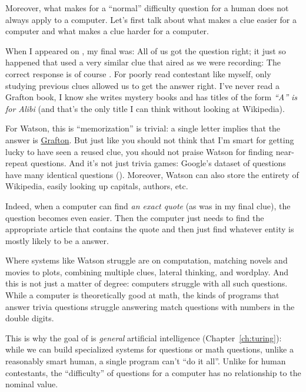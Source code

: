 Moreover, what makes for a ``normal'' difficulty question for a human
does not always apply to a computer.
%
Let's first talk about what makes a clue easier for a computer and what makes a clue harder for a computer.

When I appeared on \jeopardyp{}, my final \jeopardy{} was:
%
%
All of us got the question right; it just so happened that \jeopardy{}
used a very similar clue that aired as we were recording:
%
%
The correct response is of course .
%
For poorly read contestant like myself, only studying previous clues
allowed us to get the answer right.
%
I've never read a Grafton book, I know she writes mystery books and
has titles of the form \textit{``A'' is for Alibi} (and that's the
only title I can think without looking at Wikipedia).

For Watson, this is ``memorization'' is trivial: a single letter
implies that the answer is \underline{Grafton}.
%
But just like you should not think that I'm smart for getting lucky to
have seen a reused clue, you should not praise Watson for finding
near-repeat questions.
%
And it's not just trivia games: Google's dataset of questions have
many identical questions ().
%
Moreover, Watson can also store the entirety of Wikipedia, easily
looking up capitals, authors, etc.

Indeed, when a computer can find \emph{an exact quote} (as was in my final \jeopardy{} clue), the question becomes even easier.
%
Then the computer just needs to find the appropriate article that contains the quote and then just find whatever entity is mostly likely to be a \jeopardyp{} answer.

Where systems like Watson struggle are on computation, matching novels
and movies to plots, combining multiple clues, lateral thinking, and
wordplay.
%
And this is not just a matter of degree: computers struggle with all
such questions.
%
While a computer is theoretically good at math, the kinds of programs
that answer trivia questions struggle answering match questions with
numbers in the double digits.

This is why the goal of  is \emph{general} artificial
intelligence (Chapter~\ref{ch:turing}): while we can build specialized
systems for \jeopardy{} questions or math questions, unlike a
reasonably smart human, a single program can't ``do it all''.
%
Unlike for human contestants, the ``difficulty'' of \jeopardy{}
questions for a computer has no relationship to the nominal value.

